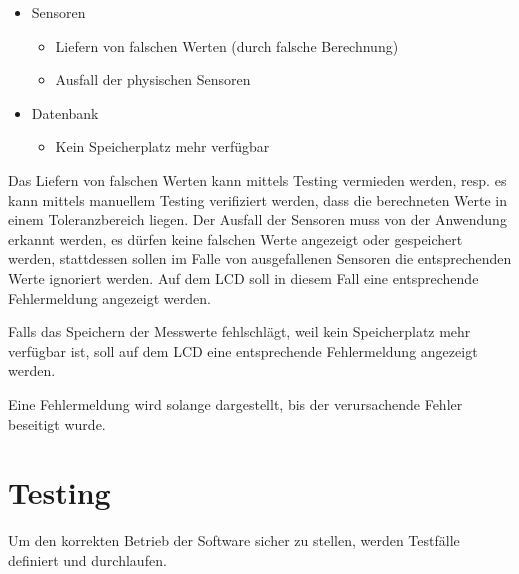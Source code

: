\documentclass[
    10pt,
    a4paper,
]{scrartcl}
\begin{document}
\begin{itemize}
    \item Sensoren
        \begin{itemize}
            \item Liefern von falschen Werten (durch falsche Berechnung)
            \item Ausfall der physischen Sensoren
        \end{itemize}
    \item Datenbank
        \begin{itemize}
            \item Kein Speicherplatz mehr verfügbar
        \end{itemize}
\end{itemize}

Das Liefern von falschen Werten kann mittels Testing vermieden werden, resp. es kann
mittels manuellem Testing verifiziert werden, dass die berechneten Werte in einem
Toleranzbereich liegen. Der Ausfall der Sensoren muss von der Anwendung erkannt werden, es
dürfen keine falschen Werte angezeigt oder gespeichert werden, stattdessen sollen im Falle
von ausgefallenen Sensoren die entsprechenden Werte ignoriert werden. Auf dem LCD soll in
diesem Fall eine entsprechende Fehlermeldung angezeigt werden.

Falls das Speichern der Messwerte fehlschlägt, weil kein Speicherplatz mehr verfügbar ist,
soll auf dem LCD eine entsprechende Fehlermeldung angezeigt werden.

Eine Fehlermeldung wird solange dargestellt, bis der verursachende Fehler beseitigt wurde.

\section{Testing}

Um den korrekten Betrieb der Software sicher zu stellen, werden Testfälle definiert und
durchlaufen.



\listoffigures




\end{document}
